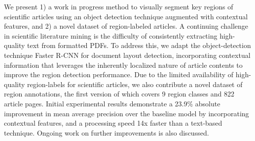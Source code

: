 We  present  1)  a  work  in  progress  method to  visually  segment  key  regions  of  scientific articles  using  an  object  detection  technique augmented with contextual features, and 2) a novel dataset of region-labeled articles. A continuing  challenge  in  scientific  literature  mining  is  the  difficulty  of  consistently  extracting  high-quality  text  from  formatted  PDFs. To address this, we adapt the object-detection technique  Faster  R-CNN  for  document  layout detection,  incorporating contextual information that leverages the inherently localized nature  of  article  contents  to  improve  the  region detection performance. Due to the limited availability  of  high-quality  region-labels  for scientific  articles,  we  also  contribute  a  novel dataset of region annotations, the first version of which covers 9 region classes and 822 article pages.  Initial experimental results demonstrate a 23.9\% absolute improvement in mean average precision over the baseline model by incorporating  contextual  features,  and  a  processing  speed  14x  faster  than  a  text-based technique. Ongoing work on further improvements is also discussed.